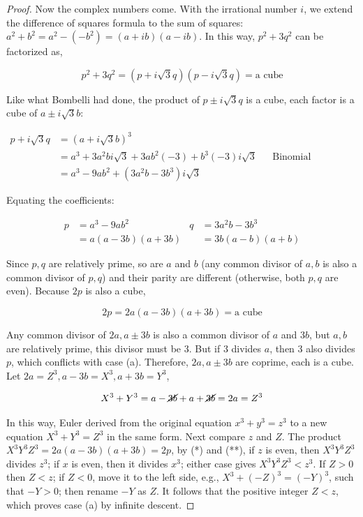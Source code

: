 \documentclass[b5paper]{article}
\begin{document}
\begin{proof}
Now the complex numbers come. With the irrational number $i$, we extend the difference of squares formula to the sum of squares: $a^2 + b^2 = a^2 - (-b^2) = (a + ib)(a - ib)$. In this way, $p^2 + 3q^2$ can be factorized as,

\[
p^2 + 3q^2 = (p + i\sqrt{3}q)(p - i\sqrt{3}q) = \text{a cube}
\]

Like what Bombelli had done, the product of $p \pm i\sqrt{3}q$ is a cube, each factor is a cube of $a \pm i\sqrt{3}b$:

\begin{align*}
p + i\sqrt{3}q &= (a + i\sqrt{3}b)^3 \\
  &= a^3 + 3a^2bi\sqrt{3} + 3ab^2(-3) + b^3(-3)i\sqrt{3} && \text{Binomial expansion} \\
  &= a^3 - 9ab^2 + (3a^2b - 3b^3)i\sqrt{3}
\end{align*}

Equating the coefficients:

\begin{align} \label{eq:Euler-gap}
p &= a^3 - 9ab^2       & q &= 3a^2b - 3b^3 \\
  &= a(a - 3b)(a + 3b) &   &= 3b(a - b)(a + b)
\end{align}

Since $p, q$ are relatively prime, so are $a$ and $b$ (any common divisor of $a, b$ is also a common divisor of $p, q$) and their parity are different (otherwise, both $p, q$ are even). Because $2p$ is also a cube,

\[
2p = 2a(a - 3b)(a + 3b) = \text{a cube}
\]

Any common divisor of $2a, a \pm 3b$ is also a common divisor of $a$ and $3b$, but $a, b$ are relatively prime, this divisor must be 3. But if 3 divides $a$, then 3 also divides $p$, which conflicts with case (a). Therefore, $2a, a \pm 3b$ are coprime, each is a cube. Let $2a = Z^3, a - 3b = X^3, a+ 3b = Y^3$,

\[
X^3 + Y^3 = a - \cancel{3b} + a + \cancel{3b} = 2a = Z^3
\]

In this way, Euler derived from the original equation $x^3 + y^3 = z^3$ to a new equation $X^3 + Y^3 = Z^3$ in the same form. Next compare $z$ and $Z$. The product $X^3Y^3Z^3 = 2a(a - 3b)(a + 3b) = 2p$, by (*) and (**), if $z$ is even, then $X^3Y^3Z^3$ divides $z^3$; if $x$ is even, then it divides $x^3$; either case gives $X^3Y^3Z^3 < z^3$. If $Z > 0$ then $Z < z$; if $Z < 0$, move it to the left side, e.g., $X^3 + (-Z)^3 = (-Y)^3$, such that $-Y > 0$; then rename $-Y$ as $Z$. It follows that the positive integer $Z < z$, which proves case (a) by infinite descent.


\end{proof}
\end{document}
